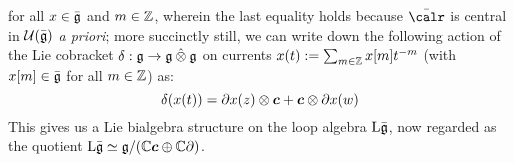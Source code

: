         for all $x \in \bar{\mathfrak{g}}$ and $m \in \mathbb{Z}$, wherein the last equality holds because $\bar{\calr}$ is central in $\mathcal{U}(\bar{\mathfrak{g}})$ \textit{a priori}; more succinctly still, we can write down the following action of the Lie cobracket $\delta: \g \to \g \hattensor \g$ on currents $x(t) := \sum_{m \in \mathbb{Z}} x[m] t^{-m}$ (with $x[m] \in \bar{\mathfrak{g}}$ for all $m \in \mathbb{Z}$) as:
            $$\delta( x(t) ) = \del x(z) \tensor \level + \level \tensor \del x(w)$$
        This gives us a Lie bialgebra structure on the loop algebra $\mathrm{L} \bar{\mathfrak{g}}$, now regarded as the quotient $\mathrm{L} \bar{\mathfrak{g}} \simeq \mathfrak{g}/(\mathbb{C} \boldsymbol{c} \oplus \mathbb{C} \partial)$. 